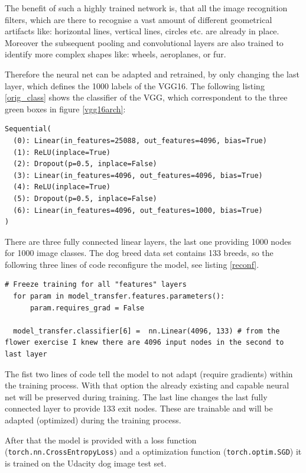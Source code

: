 \documentclass[paper=A4, DIV=10, parskip=half]{scrartcl}
\begin{document}
The benefit of such a highly trained network is, that all the image recognition
filters, which are there to recognise a vast amount of different geometrical
artifacts like: horizontal lines, vertical lines, circles etc. are already in
place. Moreover the subsequent pooling and convolutional layers are also trained
to identify more complex shapes like: wheels, aeroplanes, or fur.

Therefore the neural net can be adapted and retrained, by only changing the last
layer, which defines the 1000 labels of the VGG16. The following listing
\ref{orig_class} shows the classifier of the VGG, which correspondent to the
three green boxes in figure \ref{vgg16arch}:

\begin{lstlisting}[caption=Original VGG16 Classifier, label=orig_class]
Sequential(
  (0): Linear(in_features=25088, out_features=4096, bias=True)
  (1): ReLU(inplace=True)
  (2): Dropout(p=0.5, inplace=False)
  (3): Linear(in_features=4096, out_features=4096, bias=True)
  (4): ReLU(inplace=True)
  (5): Dropout(p=0.5, inplace=False)
  (6): Linear(in_features=4096, out_features=1000, bias=True)
)
\end{lstlisting}

There are three fully connected linear layers, the last one providing 1000 nodes
for 1000 image classes. The dog breed data set contains 133 breeds, so the
following three lines of code reconfigure the model, see listing \ref{reconf}.

\begin{lstlisting}[caption=Adapting VGG16 Classifier, label=reconf]
  # Freeze training for all "features" layers
  for param in model_transfer.features.parameters():
      param.requires_grad = False
  
  model_transfer.classifier[6] =  nn.Linear(4096, 133) # from the flower exercise I knew there are 4096 input nodes in the second to last layer
\end{lstlisting}

The fist two lines of code tell the model to not adapt (require gradients)
within the training process. With that option the already existing and capable
neural net will be preserved during training. The last line changes the last
fully connected layer to provide 133 exit nodes. These are trainable and will be
adapted (optimized) during the training process.

After that the model is provided with a loss function
(\lstinline{torch.nn.CrossEntropyLoss}) and a optimization function
(\lstinline{torch.optim.SGD}) it is trained on the Udacity dog image test set.
\end{document}
